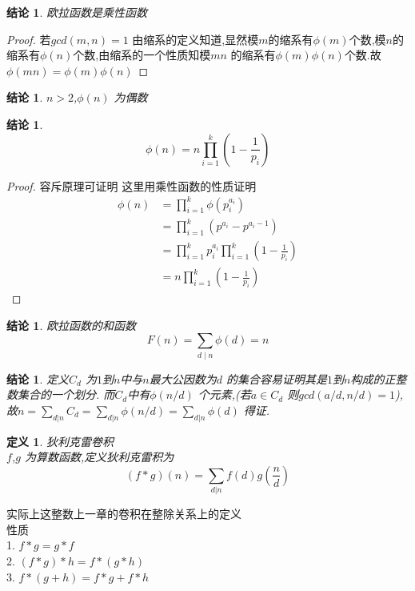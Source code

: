 \documentclass[12pt, a4paper, oneside]{ctexbook}
\newtheorem{definition}[theorem]{定义}
\newtheorem{proposition}[theorem]{结论}
\begin{document}
\begin{proposition}
  欧拉函数是乘性函数
\end{proposition}

\begin{proof}
  若$gcd(m,n)=1$
由缩系的定义知道,显然模$m$的缩系有$\phi(m)$个数,模$n$的缩系有$\phi(n)$个数,由缩系的一个性质知模$mn$ 的缩系有$\phi(m)\phi(n)$个数.故$\phi(mn)=\phi(m)\phi(n)$
\end{proof}

\begin{proposition}
  $n>2$,$\phi(n)$ 为偶数
\end{proposition}

\begin{proposition}
 $$
 \phi(n)=n\prod_{i=1}^k(1-\frac{1}{p_i})
 $$
\end{proposition}

\begin{proof}
  容斥原理可证明
这里用乘性函数的性质证明
$$
\begin{aligned}
  \phi(n)&=\prod_{i=1}^k \phi(p_i^{a_i})\\
  &=\prod_{i=1}^k(p^{a_i}-p^{a_i-1})\\
  &=\prod_{i=1}^{k} p_i^{a_i}\prod_{i=1}^k(1-\frac{1}{p_i})\\
  &= n\prod_{i=1}^k(1-\frac{1}{p_i})
\end{aligned}
$$
\end{proof}


\begin{proposition}
  欧拉函数的和函数
  $$
  F(n)=\sum_{d \mid n} \phi(d)=n
  $$
\end{proposition}

\begin{proposition}
  定义$C_d$ 为$1$到$n$中与$n$最大公因数为$d$ 的集合容易证明其是$1$到$n$构成的正整数集合的一个划分.
而$C_d$中有$\phi(n/d) $ 个元素,(若$a\in C_d$ 则$ gcd(a/d,n/d)=1 $),故$n=\sum_{d|n}C_d=\sum_{d|n}\phi(n/d)=\sum_{d|n}\phi(d)$ 得证.
\end{proposition}

\begin{definition}
  狄利克雷卷积\\
  $f$,$g$ 为算数函数,定义狄利克雷积为
  $$
  (f*g)(n)=\sum_{d|n}f(d)g\left(\frac{n}{d} \right)
  $$
\end{definition}
实际上这整数上一章的卷积在整除关系上的定义\\


性质\\
1. $f*g=g*f$\\
2. $(f*g)*h=f*(g*h) $\\
3. $f*(g+h)=f*g+f*h $\\
\end{document}
